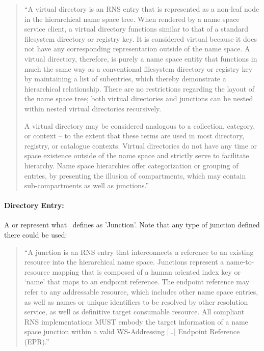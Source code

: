      \up
     \begin{quote}
 
       \small \it
 
       ``A virtual directory is an RNS entry that is represented
       as a non-leaf node in the hierarchical name space tree.
       When rendered by a name space service client, a virtual
       directory functions similar to that of a standard
       filesystem directory or registry key. It is considered
       virtual because it does not have any corresponding
       representation outside of the name space. A virtual
       directory, therefore, is purely a name space entity that
       functions in much the same way as a conventional
       filesystem directory or registry key by maintaining a
       list of subentries, which thereby demonstrate a
       hierarchical relationship. There are no restrictions
       regarding the layout of the name space tree; both virtual
       directories and junctions can be nested within nested
       virtual directories recursively.
 
       A virtual directory may be considered analogous to a
       collection, category, or context -- to the extent that
       these terms are used in most directory, registry, or
       catalogue contexts. Virtual directories do not have any
       time or space existence outside of the name space and
       strictly serve to facilitate hierarchy.  Name space
       hierarchies offer categorization or grouping of entries,
       by presenting the illusion of compartments, which may
       contain sub-compartments as well as junctions.''
     
     \end{quote}
 
 
   \paragraph{Directory Entry:}
 
     A  or  represent
     what~\cite{rns} defines as 'Junction'.  Note that any type
     of junction defined there could be used:
 
     \up
     \begin{quote}
 
       \small \it
 
       ``A junction is an RNS entry that interconnects a
       reference to an existing resource into the hierarchical
       name space. Junctions represent a name-to-resource mapping
       that is composed of a human oriented index key or `name'
       that maps to an endpoint reference. The endpoint
       reference may refer to any addressable resource, which
       includes other name space entries, as well as names or
       unique identifiers to be resolved by other resolution
       service, as well as definitive target consumable
       resource. All compliant RNS implementations MUST embody
       the target information of a name space junction within a
       valid WS-Addressing [\dots] Endpoint Reference (EPR).''
 
     \end{quote}
 
